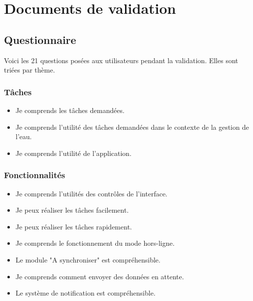 \documentclass{EPL-master-thesis-covers-FR}
\begin{document}
		\chapter{Documents de validation}
			\section*{Questionnaire}
				Voici les 21 questions posées aux utilisateurs pendant la validation. Elles sont triées par thème.
				\subsection*{Tâches}
					\begin{itemize}
						\item Je comprends les tâches demandées.
						\item Je comprends l'utilité des tâches demandées dans le contexte de la gestion de l'eau.
						\item Je comprends l'utilité de l'application.
					\end{itemize}
					
				\subsection*{Fonctionnalités}
					\begin{itemize}
						\item Je comprends l'utilités des contrôles de l'interface.
						\item Je peux réaliser les tâches facilement.
						\item Je peux réaliser les tâches rapidement.
						\item Je comprends le fonctionnement du mode hors-ligne.
						\item Le module "A synchroniser" est compréhensible.
						\item Je comprends comment envoyer des données en attente.
						\item Le système de notification est compréhensible.
					\end{itemize}
\end{document}
